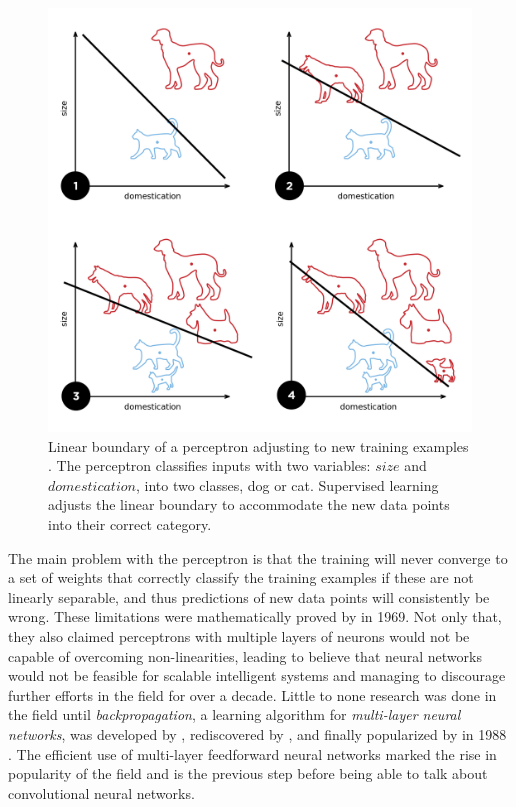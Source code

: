 \begin{figure}[htb]
  \includegraphics[width=\textwidth]{gfx/perceptron-training}
  \caption{Linear boundary of a perceptron adjusting to new training examples \cite{Goodspeed2015}.
    The perceptron classifies inputs with two variables: $size$ and $domestication$, into two classes, dog or cat.
    Supervised learning adjusts the linear boundary to accommodate the new data points into their correct category.}
  \label{fig:sec:theory:perceptron-training}
\end{figure}

The main problem with the perceptron is that the training will never converge to a set of weights that correctly classify the training examples if these are not linearly separable, and thus predictions of new data points will consistently be wrong.
These limitations were mathematically proved by \citet{Minsky1969} in 1969.
Not only that, they also claimed perceptrons with multiple layers of neurons would not be capable of overcoming non-linearities, leading to believe that neural networks would not be feasible for scalable intelligent systems and managing to discourage further efforts in the field for over a decade.
Little to none research was done in the field until \emph{backpropagation}, a learning algorithm for \emph{multi-layer neural networks}, was developed by \citet{Werbos1974}, rediscovered by \citet{Parker1985}, and finally popularized by \citet{Rumelhart1988} in 1988 \cite{Ruck1990}.
The efficient use of multi-layer feedforward neural networks marked the rise in popularity of the field and is the previous step before being able to talk about convolutional neural networks.


